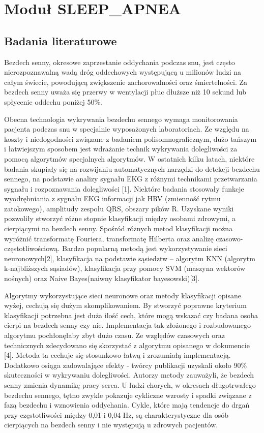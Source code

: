 \section{Moduł SLEEP\_APNEA}
\subsection{Badania literaturowe}
Bezdech senny, okresowe zaprzestanie oddychania podczas snu, jest często nierozpoznawalną wadą dróg oddechowych występującą u milionów ludzi na całym świecie, powodującą zwiększenie zachorowalności oraz śmiertelności. Za bezdech senny uważa się przerwy w wentylacji płuc dłuższe niż 10 sekund lub spłycenie oddechu poniżej 50\%.

Obecna technologia wykrywania bezdechu sennego wymaga monitorowania pacjenta podczas snu w specjalnie wyposażonych laboratoriach. Ze względu na koszty i niedogodności związane z badaniem polisomnograficznym,  dużo tańszym i łatwiejszym sposobem jest wdrażanie technik wykrywania dolegliwości za pomocą algorytmów specjalnych algorytmów. W ostatnich kilku latach, niektóre badania skupiały się na rozwijaniu automatycznych narzędzi do detekcji bezdechu sennego, na podstawie analizy sygnału EKG z różnymi technikami przetwarzania sygnału i rozpoznawania dolegliwości [1]. Niektóre badania stosowały funkcje wyodrębniania z sygnału EKG informacji jak HRV (zmienność rytmu zatokowego), amplitudy zespołu QRS, obszary pików R. Uzyskane wyniki pozwoliły stworzyć różne stopnie klasyfikacji między osobami zdrowymi, a cierpiącymi na bezdech senny.  Spośród różnych metod klasyfikacji można wyróżnić transformatę Fouriera, transformatę Hilberta oraz analizę czasowo-częstotliwościową. Bardzo popularną metodą jest wykorzystywanie sieci neuronowych[2], klasyfikacja na podstawie sąsiedztw – algorytm KNN (algorytm k-najbliższych sąsiadów), klasyfikacja przy pomocy SVM (maszyna wektorów nośnych) oraz Naive Bayes(naiwny klasyfikator bayesowski)[3].

Algorytmy wykorzystujące sieci neuronowe oraz metody klasyfikacji opisane wyżej, cechują się dużym skomplikowaniem. By stworzyć poprawne kryterium klasyfikacji potrzebna jest duża ilość cech, które mogą wskazać czy badana osoba cierpi na bezdech senny czy nie. Implementacja tak złożonego i rozbudowanego algorytmu pochłonęłaby zbyt dużo czasu. Ze względów czasowych oraz technicznych zdecydowano się skorzystać z algorytmu opisanego w dokumencie [4].  Metoda ta cechuje się stosunkowo łatwą i zrozumiałą implementacją. Dodatkowo osiąga zadowalające efekty - twórcy publikacji uzyskali około 90\% skuteczności w wykrywaniu dolegliwości.
Autorzy metody zauważyli, że bezdech senny zmienia dynamikę pracy serca. U ludzi chorych, w okresach długotrwałego bezdechu sennego, tętno zwykle pokazuje cykliczne wzrosty i spadki związane z fazą bezdechu i wznowienia oddychania. Cykle, które mają tendencje do drgań przy częstotliwości między 0,01 i 0,04 Hz, są charakterystyczne dla osób cierpiących na bezdech senny i nie występują u zdrowych pacjentów.

